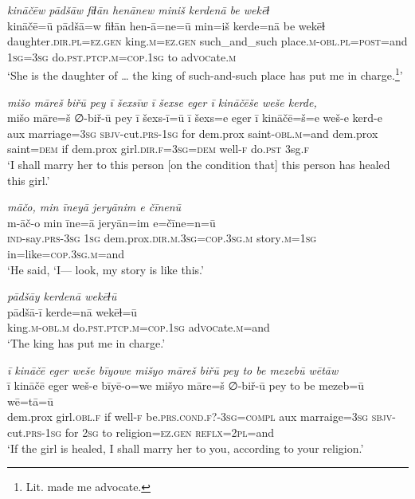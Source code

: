 \ea \label{ZP.89}
\textit{kināčēw pādšāw fiɫān henānew miniš kerdenā be wekēɫ} \\ 
\gll kināčē=ū pādšā=w fiɫān hen-ā=ne=ū min=iš kerde=nā be wekēɫ \\ 
 daughter\textsc{.dir}\textsc{.pl}\textsc{\textsc{=ez.gen}} king\textsc{.m}\textsc{\textsc{=ez.gen}} such\_and\_such place\textsc{.m}\textsc{-obl}\textsc{.pl}\textsc{=\textsc{post}}=and \textsc{1sg}\textsc{=3sg} do\textsc{.pst}\textsc{.ptcp}\textsc{.m}\textsc{=cop}\textsc{.\textsc{1sg}} to ad\textsc{voc}ate\textsc{.m} \\ 
\glt `She is the daughter of … the king of such-and-such place has put me in charge.\footnote{Lit. made me advocate.}'
\z 
 
\ea \label{ZP.90}
\textit{mišo māreš biřū pey ī šexsīw ī šexse eger ī kināčēše weše kerde,} \\ 
\gll mišo māre=š ∅-biř-ū pey ī šexs-ī=ū ī šexs=e eger ī kināčē=š=e weš-e kerd-e \\ 
 aux marriage\textsc{=3sg} \textsc{sbjv-}cut\textsc{.prs}\textsc{-\textsc{1sg}} for dem.prox saint\textsc{-obl}\textsc{.m}=and dem.prox saint\textsc{=dem} if dem.prox girl\textsc{.dir}\textsc{.f}\textsc{=3sg}\textsc{=dem} well\textsc{-f} do\textsc{.pst} 3sg\textsc{.f} \\ 
\glt `I shall marry her to this person [on the condition that] this person has healed this girl.'
\z 
 
\ea \label{ZP.98}
\textit{māčo, min īneyā jeryānim e čīnenū} \\ 
\gll m-āč-o min īne=ā jeryān=im e=čīne=n=ū \\ 
 \textsc{ind-}say\textsc{.prs}\textsc{-3sg} \textsc{1sg} dem.prox\textsc{.dir}\textsc{.m}\textsc{.3sg}\textsc{=cop}\textsc{.3sg}\textsc{.m} story\textsc{.m}\textsc{=\textsc{1sg}} in=like\textsc{=cop}\textsc{.3sg}\textsc{.m}=and \\ 
\glt `He said, ‘I— look, my story is like this.'
\z 
 
\ea \label{ZP.99}
\textit{pādšāy kerdenā wekēɫū} \\ 
\gll pādšā-ī kerde=nā wekēɫ=ū \\ 
 king\textsc{.m}\textsc{-obl}\textsc{.m} do\textsc{.pst}\textsc{.ptcp}\textsc{.m}\textsc{=cop}\textsc{.\textsc{1sg}} ad\textsc{voc}ate\textsc{.m}=and \\ 
\glt `The king has put me in charge.'
\z 
 
\ea \label{ZP.100}
\textit{ī kināčē eger weše bīyowe mišyo māreš biřū pey to be mezebū wētāw} \\ 
\gll ī kināčē eger weš-e bīyē-o=we mišyo māre=š ∅-biř-ū pey to be mezeb=ū wē=tā=ū \\ 
 dem.prox girl\textsc{.obl}\textsc{.f} if well\textsc{-f} be\textsc{.prs}.\textsc{cond}\textsc{.f}?\textsc{-3sg}\textsc{=compl} aux marraige\textsc{=3sg} \textsc{sbjv-}cut\textsc{.prs}\textsc{-\textsc{1sg}} for \textsc{2sg} to religion\textsc{\textsc{=ez.gen}} \textsc{reflx}=\textsc{2pl}=and \\ 
\glt `If the girl is healed, I shall marry her to you, according to your religion.'
\z 
 
